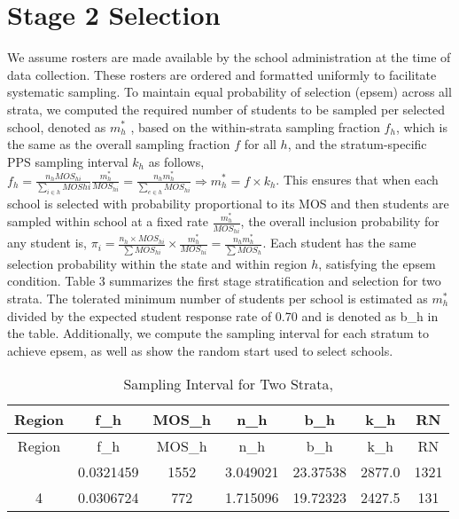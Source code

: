 \documentclass[
  12pt]{article}
\begin{document}
\section{Stage 2 Selection}\label{stage-2-selection}

We assume rosters are made available by the school administration at the
time of data collection. These rosters are ordered and formatted
uniformly to facilitate systematic sampling. To maintain equal
probability of selection (epsem) across all strata, we computed the
required number of students to be sampled per selected school, denoted
as \(m^*_h\) , based on the within-strata sampling fraction \(f_h\),
which is the same as the overall sampling fraction \(f\) for all \(h\),
and the stratum-specific PPS sampling interval \(k_h\) as follows,
\(f_h = \frac{n_h MOS_{hi} }{\sum_{i \in h} MOS{hi} } \frac{m^*_h}{MOS_{hi}} = \frac{n_h m^*_h}{\sum_{e \in h}MOS_{hi}} \Rightarrow m^*_h = f \times k_h\).
This ensures that when each school is selected with probability
proportional to its MOS and then students are sampled within school at a
fixed rate \(\frac{m^*_h}{MOS_{hi}}\), the overall inclusion probability
for any student is,
\(\pi_{i} = \frac{n_h \times MOS_{hi}}{\sum MOS_{hi}} \times \frac{m^*_h}{MOS_{hi}} = \frac{n_h m^*_h}{\sum MOS_h}\).
Each student has the same selection probability within the state and
within region \(h\), satisfying the epsem condition. Table 3 summarizes
the first stage stratification and selection for two strata. The
tolerated minimum number of students per school is estimated as
\(m^*_h\) divided by the expected student response rate of 0.70 and is
denoted as b\_h in the table. Additionally, we compute the sampling
interval for each stratum to achieve epsem, as well as show the random
start used to select schools.

\begin{longtable}[]{@{}ccccccc@{}}
\caption{Sampling Interval for Two Strata,}\tabularnewline
\toprule\noalign{}
Region & f\_h & MOS\_h & n\_h & b\_h & k\_h & RN \\
\midrule\noalign{}
\endfirsthead
\toprule\noalign{}
Region & f\_h & MOS\_h & n\_h & b\_h & k\_h & RN \\
\midrule\noalign{}
\endhead
\bottomrule\noalign{}
\endlastfoot
3 & 0.0321459 & 1552 & 3.049021 & 23.37538 & 2877.0 & 1321 \\
4 & 0.0306724 & 772 & 1.715096 & 19.72323 & 2427.5 & 131 \\
\end{longtable}
\end{document}
